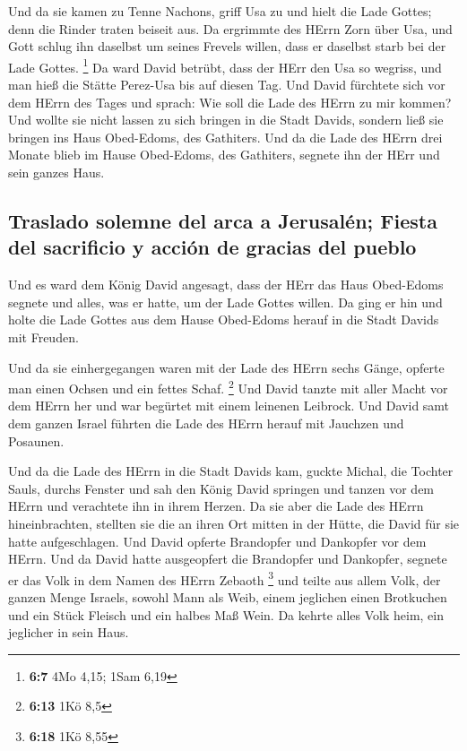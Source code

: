  Und da sie kamen zu Tenne Nachons, griff Usa zu und hielt
die Lade Gottes; denn die Rinder traten beiseit aus.  Da
ergrimmte des HErrn Zorn über Usa, und Gott schlug ihn daselbst um
seines Frevels willen, dass er daselbst starb bei der Lade Gottes.
\footnote{\textbf{6:7} 4Mo 4,15; 1Sam 6,19}  Da ward David
betrübt, dass der HErr den Usa so wegriss, und man hieß die Stätte
Perez-Usa bis auf diesen Tag.  Und David fürchtete sich
vor dem HErrn des Tages und sprach: Wie soll die Lade des HErrn zu mir
kommen?  Und wollte sie nicht lassen zu sich bringen in
die Stadt Davids, sondern ließ sie bringen ins Haus Obed-Edoms, des
Gathiters.  Und da die Lade des HErrn drei Monate blieb
im Hause Obed-Edoms, des Gathiters, segnete ihn der HErr und sein ganzes
Haus.

\hypertarget{traslado-solemne-del-arca-a-jerusaluxe9n-fiesta-del-sacrificio-y-acciuxf3n-de-gracias-del-pueblo}{%
\subsection{Traslado solemne del arca a Jerusalén; Fiesta del sacrificio
y acción de gracias del
pueblo}\label{traslado-solemne-del-arca-a-jerusaluxe9n-fiesta-del-sacrificio-y-acciuxf3n-de-gracias-del-pueblo}}

 Und es ward dem König David angesagt, dass der HErr das
Haus Obed-Edoms segnete und alles, was er hatte, um der Lade Gottes
willen. Da ging er hin und holte die Lade Gottes aus dem Hause
Obed-Edoms herauf in die Stadt Davids mit Freuden.

 Und da sie einhergegangen waren mit der Lade des HErrn
sechs Gänge, opferte man einen Ochsen und ein fettes Schaf. \footnote{\textbf{6:13}
  1Kö 8,5}  Und David tanzte mit aller Macht vor dem
HErrn her und war begürtet mit einem leinenen Leibrock. 
Und David samt dem ganzen Israel führten die Lade des HErrn herauf mit
Jauchzen und Posaunen.

 Und da die Lade des HErrn in die Stadt Davids kam,
guckte Michal, die Tochter Sauls, durchs Fenster und sah den König David
springen und tanzen vor dem HErrn und verachtete ihn in ihrem Herzen.
 Da sie aber die Lade des HErrn hineinbrachten, stellten
sie die an ihren Ort mitten in der Hütte, die David für sie hatte
aufgeschlagen. Und David opferte Brandopfer und Dankopfer vor dem HErrn.
 Und da David hatte ausgeopfert die Brandopfer und
Dankopfer, segnete er das Volk in dem Namen des HErrn Zebaoth
\footnote{\textbf{6:18} 1Kö 8,55}  und teilte aus allem
Volk, der ganzen Menge Israels, sowohl Mann als Weib, einem jeglichen
einen Brotkuchen und ein Stück Fleisch und ein halbes Maß Wein. Da
kehrte alles Volk heim, ein jeglicher in sein Haus.

